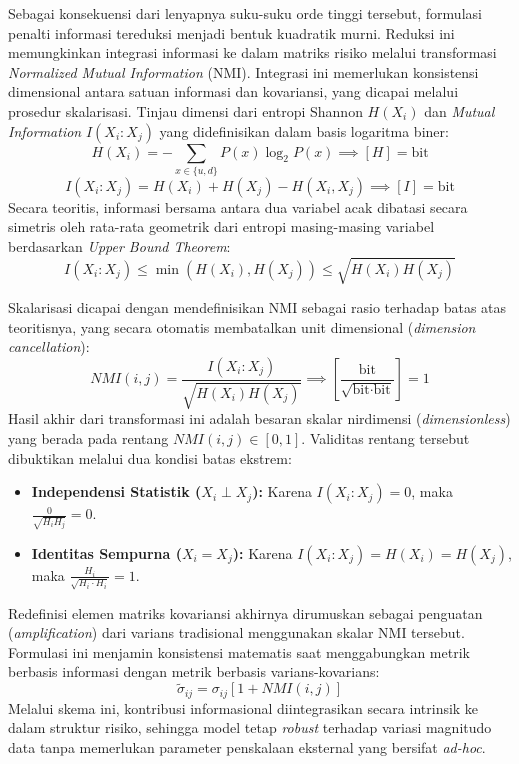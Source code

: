 Sebagai konsekuensi dari lenyapnya suku-suku orde tinggi tersebut, formulasi penalti informasi tereduksi menjadi bentuk kuadratik murni. Reduksi ini memungkinkan integrasi informasi ke dalam matriks risiko melalui transformasi \textit{Normalized Mutual Information} (NMI). Integrasi ini memerlukan konsistensi dimensional antara satuan informasi dan kovariansi, yang dicapai melalui prosedur skalarisasi. Tinjau dimensi dari entropi Shannon $H(X_i)$ dan \textit{Mutual Information} $I(X_i : X_j)$ yang didefinisikan dalam basis logaritma biner:
\begin{equation}
    H(X_i) = -\sum_{x \in \{u,d\}} P(x) \log_2 P(x) \implies [H] = \text{bit}
\end{equation}
\begin{equation}
    I(X_i : X_j) = H(X_i) + H(X_j) - H(X_i, X_j) \implies [I] = \text{bit}
\end{equation}
Secara teoritis, informasi bersama antara dua variabel acak dibatasi secara simetris oleh rata-rata geometrik dari entropi masing-masing variabel berdasarkan \textit{Upper Bound Theorem}:
\begin{equation}
    I(X_i : X_j) \le \min(H(X_i), H(X_j)) \le \sqrt{H(X_i) H(X_j)}
\end{equation}

Skalarisasi dicapai dengan mendefinisikan NMI sebagai rasio terhadap batas atas teoritisnya, yang secara otomatis membatalkan unit dimensional (\textit{dimension cancellation}):
\begin{equation}
    NMI(i,j) = \frac{I(X_i : X_j)}{\sqrt{H(X_i) H(X_j)}} \implies \left[ \frac{\text{bit}}{\sqrt{\text{bit} \cdot \text{bit}}} \right] = 1
\end{equation}
Hasil akhir dari transformasi ini adalah besaran skalar nirdimensi (\textit{dimensionless}) yang berada pada rentang $NMI(i,j) \in [0, 1]$. Validitas rentang tersebut dibuktikan melalui dua kondisi batas ekstrem:
\begin{itemize}
    \item \textbf{Independensi Statistik ($X_i \perp X_j$):} Karena $I(X_i:X_j) = 0$, maka $\frac{0}{\sqrt{H_i H_j}} = 0$.
    \item \textbf{Identitas Sempurna ($X_i = X_j$):} Karena $I(X_i:X_j) = H(X_i) = H(X_j)$, maka $\frac{H_i}{\sqrt{H_i \cdot H_i}} = 1$.
\end{itemize}

Redefinisi elemen matriks kovariansi akhirnya dirumuskan sebagai penguatan (\textit{amplification}) dari varians tradisional menggunakan skalar NMI tersebut. Formulasi ini menjamin konsistensi matematis saat menggabungkan metrik berbasis informasi dengan metrik berbasis varians-kovarians:
\begin{equation}
    \tilde{\sigma}_{ij} = \sigma_{ij} [1 + NMI(i,j)]
\end{equation}
Melalui skema ini, kontribusi informasional diintegrasikan secara intrinsik ke dalam struktur risiko, sehingga model tetap \textit{robust} terhadap variasi magnitudo data tanpa memerlukan parameter penskalaan eksternal yang bersifat \textit{ad-hoc}.
